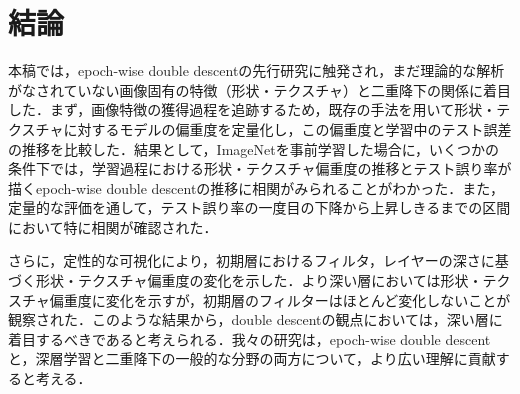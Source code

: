 \chapter{結論}
本稿では，epoch-wise double descentの先行研究に触発され，まだ理論的な解析がなされていない画像固有の特徴（形状・テクスチャ）と二重降下の関係に着目した．まず，画像特徴の獲得過程を追跡するため，既存の手法を用いて形状・テクスチャに対するモデルの偏重度を定量化し，この偏重度と学習中のテスト誤差の推移を比較した．結果として，ImageNetを事前学習した場合に，いくつかの条件下では，学習過程における形状・テクスチャ偏重度の推移とテスト誤り率が描くepoch-wise double descentの推移に相関がみられることがわかった．また，定量的な評価を通して，テスト誤り率の一度目の下降から上昇しきるまでの区間において特に相関が確認された．

さらに，定性的な可視化により，初期層におけるフィルタ，レイヤーの深さに基づく形状・テクスチャ偏重度の変化を示した．より深い層においては形状・テクスチャ偏重度に変化を示すが，初期層のフィルターはほとんど変化しないことが観察された．このような結果から，double descentの観点においては，深い層に着目するべきであると考えられる．我々の研究は，epoch-wise double descentと，深層学習と二重降下の一般的な分野の両方について，より広い理解に貢献すると考える．
\newpage